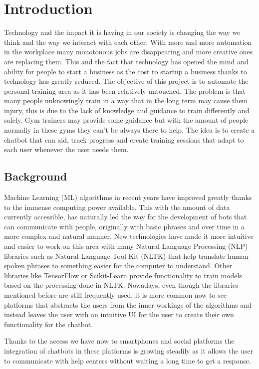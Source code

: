 \chapter{Introduction}\label{chap:1}
Technology and the impact it is having in our society is changing the way we think and the way we interact with each other. With more and more automation in the workplace many monotonous jobs are disappearing and more creative ones are replacing them. This and the fact that technology has opened the mind and ability for people to start a business as the cost to startup a business thanks to technology has greatly reduced.
The objective of this project is to automate the personal training area as it has been relatively untouched. The problem is that many people unknowingly train in a way that in the long term may cause them injury, this is due to the lack of knowledge and guidance to train differently and safely. Gym trainers may provide some guidance but with the amount of people normally in these gyms they can’t be always there to help. The idea is to create a chatbot that can aid, track progress and create training sessions that adapt to each user whenever the user needs them. 
\section{Background}\label{sec:chap1_background}
Machine Learning (ML) algorithms in recent years have improved greatly thanks to the immense computing power available. This with the amount of data currently accessible, has naturally led the way for the development of bots that can communicate with people, originally with basic phrases and over time in a more complex and natural manner. New technologies have made it more intuitive and easier to work on this area with many Natural Language Processing (NLP) libraries such as Natural Language Tool Kit (NLTK) that help translate human spoken phrases to something easier for the computer to understand. Other libraries like TensorFlow or Scikit-Learn provide functionality to train models based on the processing done in NLTK.
Nowadays, even though the libraries mentioned before are still frequently used, it is more common now to see platforms that abstracts the users from the inner workings of the algorithms and instead leaves the user with an intuitive UI for the user to create their own functionality for the chatbot.

Thanks to the access we have now to smartphones and social platforms the integration of chatbots in these platforms is growing steadily as it allows the user to communicate with help centers without waiting a long time to get a response.

